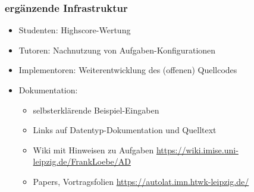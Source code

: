 \begin{frame}
\frametitle{ergänzende Infrastruktur}

\begin{itemize}
\item Studenten: 
  Highscore-Wertung
\item Tutoren: 
   Nachnutzung von
    Aufgaben-Konfigurationen
\item Implementoren:
  Weiterentwicklung des (offenen) Quellcodes
\item Dokumentation:
  \begin{itemize}
  \item selbsterklärende Beispiel-Eingaben
  \item Links auf Datentyp-Dokumentation und 
    Quelltext
  \item Wiki mit Hinweisen zu Aufgaben
    \url{https://wiki.imise.uni-leipzig.de/FrankLoebe/AD}
  \item Papers, Vortragsfolien \url{https://autolat.imn.htwk-leipzig.de/}
  \end{itemize}
\end{itemize}


\end{frame}
